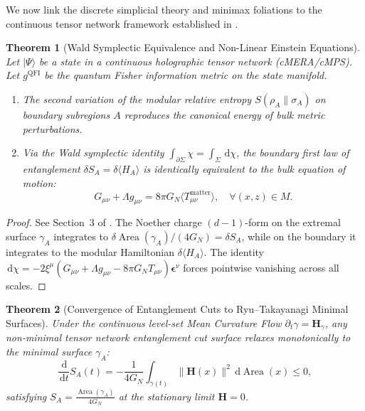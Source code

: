 \documentclass[11pt,a4paper,reqno]{amsart}
\newtheorem{theorem}{Theorem}[section]
\theoremstyle{definition}
\numberwithin{equation}{section}
\newcommand{\Area}{\operatorname{Area}}
\newcommand{\dif}{\,\mathrm{d}}
\begin{document}
We now link the discrete simplicial theory and minimax foliations to the continuous tensor network framework established in \cite{turing2026beyond, turing2026flows, turing2026spacetime}.

\begin{theorem}[Wald Symplectic Equivalence and Non-Linear Einstein Equations]
\label{thm:grand_einstein_emergence}
Let $|\Psi\rangle$ be a state in a continuous holographic tensor network (cMERA/cMPS). Let $g^{\mathrm{QFI}}$ be the quantum Fisher information metric on the state manifold.
\begin{enumerate}[label=(\roman*)]
    \item The second variation of the modular relative entropy $S(\rho_A \| \sigma_A)$ on boundary subregions $A$ reproduces the canonical energy of bulk metric perturbations.
    \item Via the Wald symplectic identity $\int_{\partial \Sigma} \chi = \int_\Sigma \dif \chi$, the boundary first law of entanglement $\delta S_A = \delta \langle H_A \rangle$ is identically equivalent to the bulk equation of motion:
    \begin{equation}
        G_{\mu\nu} + \Lambda g_{\mu\nu} = 8\pi G_N \langle T_{\mu\nu}^{\mathrm{matter}} \rangle, \quad \forall (x, z) \in M.
    \end{equation}
\end{enumerate}
\end{theorem}
\begin{proof}
See Section~3 of \cite{turing2026spacetime}. The Noether charge $(d-1)$-form on the extremal surface $\gamma_A$ integrates to $\delta \Area(\gamma_A) / (4 G_N) = \delta S_A$, while on the boundary it integrates to the modular Hamiltonian $\delta \langle H_A \rangle$. The identity $\dif \chi = -2 \xi^\mu (G_{\mu\nu} + \Lambda g_{\mu\nu} - 8\pi G_N T_{\mu\nu}) \mathbf{\epsilon}^\nu$ forces pointwise vanishing across all scales.
\end{proof}

\begin{theorem}[Convergence of Entanglement Cuts to Ryu--Takayanagi Minimal Surfaces]
\label{thm:rt_mcf_convergence}
Under the continuous level-set Mean Curvature Flow $\partial_t \gamma = \mathbf{H}_\gamma$, any non-minimal tensor network entanglement cut surface relaxes monotonically to the minimal surface $\gamma_A$:
\begin{equation}
    \frac{\dif}{\dif t} S_A(t) = -\frac{1}{4 G_N} \int_{\gamma(t)} \|\mathbf{H}(x)\|^2 \dif \Area(x) \le 0,
\end{equation}
satisfying $S_A = \frac{\Area(\gamma_A)}{4 G_N}$ at the stationary limit $\mathbf{H} = 0$.
\end{theorem}
\end{document}
